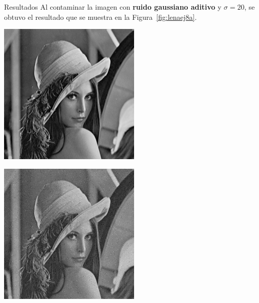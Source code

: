 \documentclass{beamer}
\begin{document}
\begin{frame}[fragile]{Resultados}
	\justifying
	Al contaminar la imagen con \textcolor{unahurverde}{\textbf{ruido gaussiano aditivo}} y $\sigma=20$, 
	se obtuvo el resultado que se muestra en la Figura~\ref{fig:lenaej8a}.
	\vspace{0.5cm}
	
	\centering
	\begin{minipage}{0.45\linewidth}
		\centering
		\includegraphics[width=\linewidth]{../results/lena_original}
		\label{fig:lenaoriginal8a}
	\end{minipage}\hfill
	\begin{minipage}{0.45\linewidth}
		\centering
		\includegraphics[width=\linewidth]{../results/lena_ej8a}

\end{minipage}
\end{frame}
\end{document}
